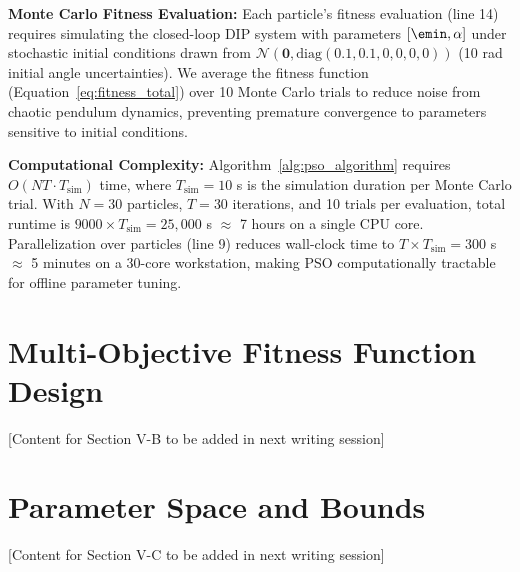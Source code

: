 \textbf{Monte Carlo Fitness Evaluation:} Each particle's fitness evaluation (line 14) requires simulating the closed-loop DIP system with parameters $[\emin, \alpha]$ under stochastic initial conditions drawn from $\mathcal{N}(\mathbf{0}, \text{diag}(0.1, 0.1, 0, 0, 0, 0))$ (10 rad initial angle uncertainties). We average the fitness function (Equation~\ref{eq:fitness_total}) over 10 Monte Carlo trials to reduce noise from chaotic pendulum dynamics, preventing premature convergence to parameters sensitive to initial conditions.

\textbf{Computational Complexity:} Algorithm~\ref{alg:pso_algorithm} requires $O(NT \cdot T_{\text{sim}})$ time, where $T_{\text{sim}} = 10$ s is the simulation duration per Monte Carlo trial. With $N=30$ particles, $T=30$ iterations, and 10 trials per evaluation, total runtime is $9000 \times T_{\text{sim}} = 25,000$ s $\approx$ 7 hours on a single CPU core. Parallelization over particles (line 9) reduces wall-clock time to $T \times T_{\text{sim}} = 300$ s $\approx$ 5 minutes on a 30-core workstation, making PSO computationally tractable for offline parameter tuning.

\section{Multi-Objective Fitness Function Design}
\label{sec:fitness_function}

[Content for Section V-B to be added in next writing session]


\section{Parameter Space and Bounds}
\label{sec:parameter_space}

[Content for Section V-C to be added in next writing session]


